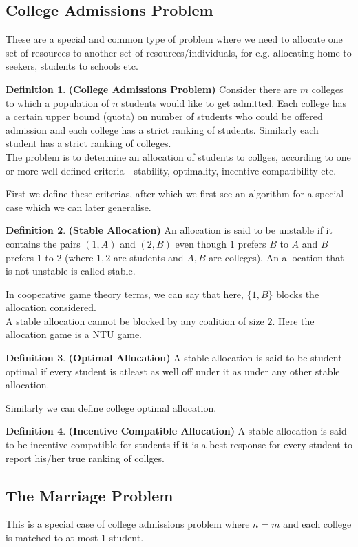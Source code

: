 \documentclass{article}
\theoremstyle{definition}
\newtheorem{defn}{Definition}[section]
\begin{document}
\subsection{College Admissions Problem}
These are a special and common type of problem where we need to allocate one set of resources to another set of resources/individuals, for e.g. allocating home to seekers, students to schools etc.
\begin{defn}
\textbf{(College Admissions Problem)} Consider there are $m$ colleges to which a population of $n$ students would like to get admitted. Each college has a certain upper bound (quota) on number of students who could be offered admission and each college has a strict ranking of students. Similarly each student has a strict ranking of colleges.\\
The problem is to determine an allocation of students to collges, according to one or more well defined criteria - stability, optimality, incentive compatibility etc.
\end{defn}
First we define these criterias, after which we first see an algorithm for a special case which we can later generalise.
\begin{defn}
\textbf{(Stable Allocation)} An allocation is said to be unstable if it contains the pairs $(1,A)$ and $(2,B)$ even though $1$ prefers $B$ to $A$ and $B$ prefers $1$ to $2$ (where $1,2$ are students and $A,B$ are colleges). An allocation that is not unstable is called stable.
\end{defn}
In cooperative game theory terms, we can say that here, $\{1,B\}$ blocks the allocation considered.\\
A stable allocation cannot be blocked by any coalition of size $2$. Here the allocation game is a NTU game.
\begin{defn}
\textbf{(Optimal Allocation)} A stable allocation is said to be student optimal if every student is atleast as well off under it as under any other stable allocation.
\end{defn}
Similarly we can define college optimal allocation.
\begin{defn}
\textbf{(Incentive Compatible Allocation)} A stable allocation is said to be incentive compatible for students if it is a best response for every student to report his/her true ranking of collges.
\end{defn}
\subsection{The Marriage Problem}
This is a special case of college admissions problem where $n=m$ and each college is matched to at most 1 student.
\end{document}
